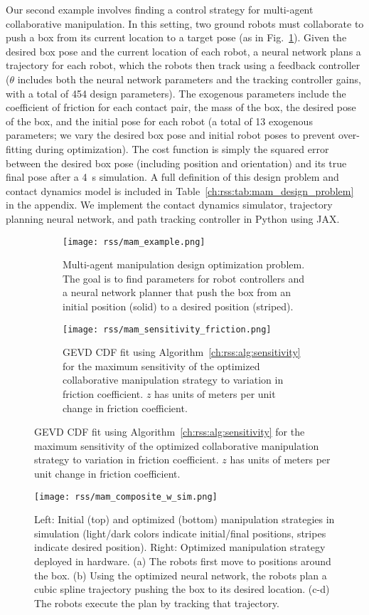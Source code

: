 Our second example involves finding a control strategy for multi-agent collaborative manipulation. In this setting, two ground robots must collaborate to push a box from its current location to a target pose (as in Fig.~\ref{ch:rss:fig:mam_example}). Given the desired box pose and the current location of each robot, a neural network plans a trajectory for each robot, which the robots then track using a feedback controller ($\theta$ includes both the neural network parameters and the tracking controller gains, with a total of 454 design parameters). The exogenous parameters include the coefficient of friction for each contact pair, the mass of the box, the desired pose of the box, and the initial pose for each robot (a total of 13 exogenous parameters; we vary the desired box pose and initial robot poses to prevent over-fitting during optimization). The cost function is simply the squared error between the desired box pose (including position and orientation) and its true final pose after a \SI{4}{s} simulation. A full definition of this design problem and contact dynamics model is included in Table~\ref{ch:rss:tab:mam_design_problem} in the appendix. We implement the contact dynamics simulator, trajectory planning neural network, and path tracking controller in Python using JAX.

\begin{figure}[tb]
    \centering
    \begin{subfigure}[c]{0.45\linewidth}
        \centering
        \texttt{[image: rss/mam\_example.png]}
        \caption{Multi-agent manipulation design optimization problem. The goal is to find parameters for robot controllers and a neural network planner that push the box from an initial position (solid) to a desired position (striped).}
        \label{ch:rss:fig:mam_example}
    \end{subfigure}
    \quad
    \begin{subfigure}[c]{0.45\linewidth}
        \centering
        \texttt{[image: rss/mam\_sensitivity\_friction.png]}
        \caption{GEVD CDF fit using Algorithm~\ref{ch:rss:alg:sensitivity} for the maximum sensitivity of the optimized collaborative manipulation strategy to variation in friction coefficient. $z$ has units of meters per unit change in friction coefficient.}
        \label{ch:rss:fig:mam_gevd}
    \end{subfigure}
\end{figure}

\begin{figure}[tb]
    \centering
    \texttt{[image: rss/mam\_composite\_w\_sim.png]}
    \caption{Left: Initial (top) and optimized (bottom) manipulation strategies in simulation (light/dark colors indicate initial/final positions, stripes indicate desired position). Right: Optimized manipulation strategy deployed in hardware. (a) The robots first move to positions around the box. (b) Using the optimized neural network, the robots plan a cubic spline trajectory pushing the box to its desired location. (c-d) The robots execute the plan by tracking that trajectory.}
    \label{ch:rss:fig:mam_hw}
\end{figure}


